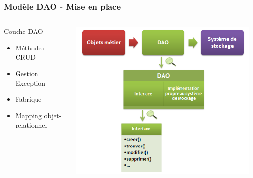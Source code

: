 \begin{frame}
    \frametitle{Modèle DAO - Mise en place}
     	\begin{columns}
  				\begin{column}{4cm}
  				\begin{block}{Couche DAO}
  				
  					\begin{itemize}
  						\item Méthodes CRUD
  						\item Gestion Exception
  						\item Fabrique 
  						\item Mapping objet-relationnel
  					\end{itemize}
  				\end{block}

  				\end{column}
  				\begin{column}{7cm}
  				      \includegraphics[scale=0.4]{images/dao2.png}
  				\end{column}
  			\end{columns}

\end{frame}